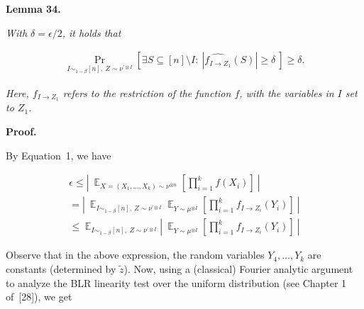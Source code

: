 \documentclass[10pt,a4paper]{article}
\begin{document}
\par\medskip\noindent\textbf{
\textbf{Lemma 34}\textbf{.}
}\par



\emph{With $\delta=\epsilon/2$, it holds that}\par


\[\begin{gathered}
\Pr_{I\sim_{1-\beta}[n],\ Z\sim\nu^{\prime\otimes I}}\left[\exists S\subseteq[n]\setminus I:\ \left|\widehat{f_{I\to Z_{1}}}(S)\right|\geqslant\delta\ \right]\geqslant\delta.
\end{gathered}\]


\emph{Here, $f_{I\to Z_{1}}$ refers to the restriction of the function $f$, with the variables in $I$ set to $Z_{1}$.}\par






\par\medskip\noindent\textbf{Proof.}\par




By Equation 1, we have\par


\[\begin{gathered}
\displaystyle\epsilon \displaystyle\leqslant\left|\ \mathop{\mathbb{E}}_{X=(X_{1},\dots,X_{k})\sim\nu^{\otimes n}}\left[\prod_{i=1}^{k}f(X_{i})\right]\ \right| \\
\displaystyle=\left|\ \mathop{\mathbb{E}}_{I\sim_{1-\beta}[n],\ Z\sim\nu^{\prime\otimes I}}\mathop{\mathbb{E}}_{Y\sim\mu^{\otimes\bar{I}}}\left[\prod_{i=1}^{k}f_{I\to Z_{i}}(Y_{i})\right]\ \right| \\
\displaystyle\leqslant\mathop{\mathbb{E}}_{I\sim_{1-\beta}[n],\ Z\sim\nu^{\prime\otimes I}}\left|\ \mathop{\mathbb{E}}_{Y\sim\mu^{\otimes\bar{I}}}\left[\prod_{i=1}^{k}f_{I\to Z_{i}}(Y_{i})\right]\ \right|
\end{gathered}\]


Observe that in the above expression, the random variables $Y_{4},\dots,Y_{k}$ are constants (determined by $\tilde{z}$).
Now, using a (classical) Fourier analytic argument to analyze the BLR linearity test over the uniform distribution (see Chapter 1 of [28]), we get\par
\end{document}
